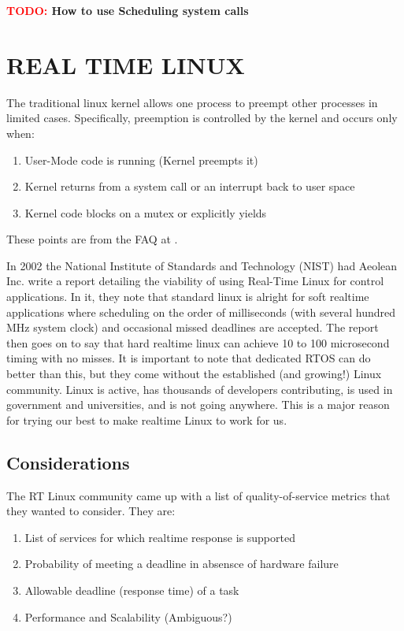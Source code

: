 \documentclass{article}
\newcommand{\TODO}[1]{ {\bf \textcolor{red}{TODO:} #1 }}
\begin{document}
\TODO{How to use Scheduling system calls}

\section{REAL TIME LINUX}
The traditional linux kernel allows one process to preempt other processes in limited cases.  Specifically, preemption is controlled by the kernel and occurs only when:

\begin{enumerate}
\item User-Mode code is running (Kernel preempts it)
\item Kernel returns from a system call or an interrupt back to user space
\item Kernel code blocks on a mutex or explicitly yields
\end{enumerate}
These points are from the FAQ at \cite{RealTimeLinux}.

In 2002 the National Institute of Standards and Technology (NIST) had Aeolean Inc. write a report detailing the viability of using Real-Time Linux for control applications. \cite{IntroLinuxForRealTime}  In it, they note that standard linux is alright for soft realtime applications where scheduling on the order of milliseconds (with several hundred MHz system clock) and occasional missed deadlines are accepted.  The report then goes on to say that hard realtime linux can achieve 10 to 100 microsecond timing with no misses.  It is important to note that dedicated RTOS can do better than this, but they come without the established (and growing!) Linux community.  Linux is active, has thousands of developers contributing, is used in government and universities, and is not going anywhere.  This is a major reason for trying our best to make realtime Linux to work for us.

\subsection{Considerations}
The RT Linux community came up with a list of quality-of-service metrics that they wanted to consider. \cite{RTLSummaryPost}  They are:
\begin{enumerate}
\item List of services for which realtime response is supported
\item Probability of meeting a deadline in absensce of hardware failure
\item Allowable deadline (response time) of a task
\item Performance and Scalability (Ambiguous?)
\end{enumerate}
\end{document}
